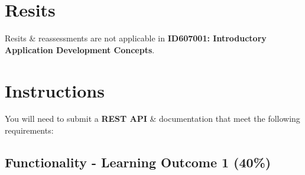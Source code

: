 \documentclass{article}
\begin{document}
\section*{Resits}
Resits \& reassessments are not applicable in \textbf{ID607001: Introductory Application Development Concepts}. 

\newpage

\section*{Instructions}
You will need to submit a \textbf{REST API} \& documentation that meet the following requirements: \\

\subsection*{Functionality - Learning Outcome 1 (40\%)}
\end{document}
